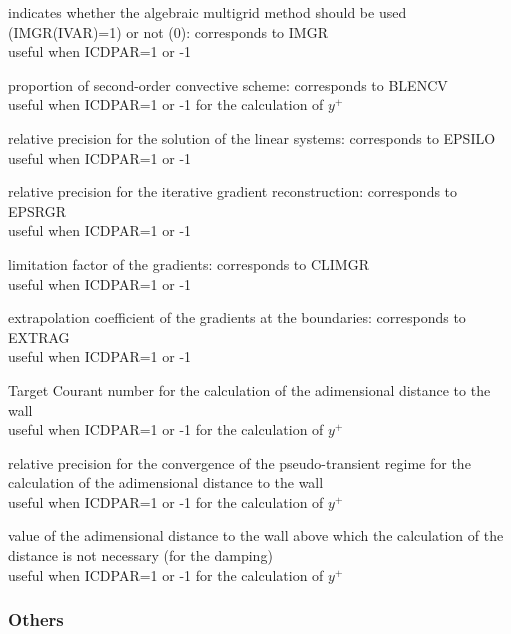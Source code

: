 {indicates whether the algebraic
multigrid method should be used (IMGR(IVAR)=1) or not (0): corresponds to IMGR\\
useful when ICDPAR=1 or -1}

{proportion of second-order convective scheme: corresponds to BLENCV\\
useful when ICDPAR=1 or -1 for the calculation of $y^+$}

{relative precision for the solution of the linear systems: corresponds to EPSILO\\
useful when ICDPAR=1 or -1}

{relative precision for the iterative gradient reconstruction: corresponds to EPSRGR\\
useful when ICDPAR=1 or -1}

{limitation factor of the gradients: corresponds to CLIMGR\\
useful when ICDPAR=1 or -1}

{extrapolation coefficient of the gradients at the boundaries: corresponds to EXTRAG\\
useful when ICDPAR=1 or -1}

{Target Courant number for the calculation of the adimensional distance
to the wall\\ 
useful when ICDPAR=1 or -1 for the calculation of $y^+$}

{relative precision for the convergence of the pseudo-transient regime
for the calculation of the adimensional distance to the wall\\
useful when ICDPAR=1 or -1  for the calculation of $y^+$}

{value of the adimensional distance to the wall above which the
calculation of the distance is not necessary (for the damping)\\
useful when ICDPAR=1 or -1 for the calculation of $y^+$}


\subsubsection{Others}

